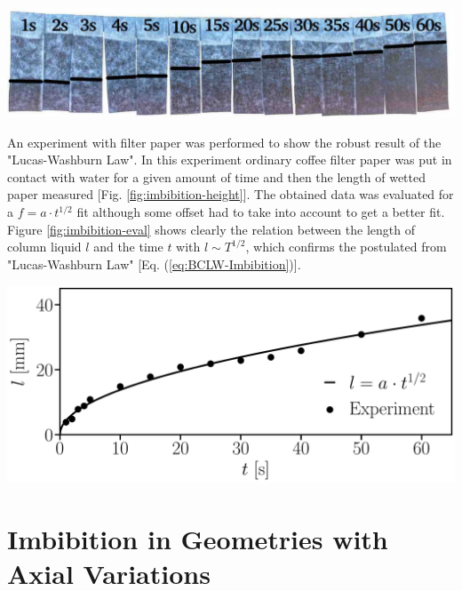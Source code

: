 \documentclass[aip, amsmath, amssymb, reprint, twocolumn, floatfix]{revtex4-1}
\begin{document}
\begin{center}
	\captionsetup{type=figure}
	\includegraphics[width = \linewidth]{../pictures/experiments/filter-paper_water_1s-60s_backlight.pdf}
	\label{fig:imbibition-height}
\end{center}

An experiment with filter paper \cite{Dullien1991} was performed to show the robust result of the "Lucas-Washburn Law". In this experiment ordinary coffee filter paper was put in contact with water for a given amount of time and then the length of wetted paper measured [Fig. \ref{fig:imbibition-height}]. The obtained data was evaluated for a $f = a \cdot t^{1/2}$ fit although some offset had to take into account to get a better fit. Figure \ref{fig:imbibition-eval} shows clearly the relation between the length of column liquid $l$ and the time $t$ with $l \sim T^{1/2}$, which confirms the postulated from "Lucas-Washburn Law" [Eq. (\ref{eq:BCLW-Imbibition})]. 

\begin{center}
	\captionsetup{type=figure}
	\includegraphics[width = \linewidth]{../pictures/experiments/filter-paper_water_1s-60s_eval_origin-offset.pdf}
	\label{fig:imbibition-eval}
\end{center}

\section{Imbibition in Geometries with Axial Variations}
\label{sec:geometry}
\end{document}
